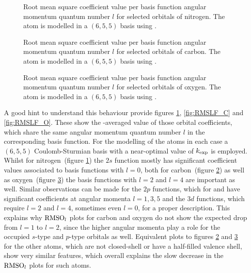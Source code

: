 \begin{figure}
	\centering
	\caption[
		Root mean square coefficient value
		per angular momentum for nitrogen
	]
	{
		Root mean square coefficient value per
		basis function angular momentum quantum number $l$
		for selected orbitals of nitrogen.
		The atom is modelled
		in a $(6,5,5)$ \CS basis using \UHF.
	}
	\label{fig:RMSLF_N}
\end{figure}
\begin{figure}
	\centering
	\caption[
		Root mean square coefficient value
		per angular momentum for carbon
	]
	{
		Root mean square coefficient value per
		basis function angular momentum quantum number $l$
		for selected orbitals of carbon.
		The atom is modelled
		in a $(6,5,5)$ \CS basis using \UHF.
	}
	\label{fig:RMSLF_C}
\end{figure}
\begin{figure}
	\centering
	\caption[
		Root mean square coefficient value
		per angular momentum for oxygen
	]
	{
		Root mean square coefficient value per
		basis function angular momentum quantum number $l$
		for selected orbitals of oxygen.
		The atom is modelled
		in a $(6,5,5)$ \CS basis using \UHF.
	}
	\label{fig:RMSLF_O}
\end{figure}
A good hint to understand this behaviour provide figures
\ref{fig:RMSLF_N}, \vref{fig:RMSLF_C} and \vref{fig:RMSLF_O}.
These show the \RMS-averaged value of those orbital coefficients,
which share the same angular momentum quantum number $l$ in the corresponding
basis function.
For the modelling of the atoms in each case
a $(6,5,5)$ Coulomb-Sturmian basis with a near-optimal value of $k_\text{exp}$ is employed.
Whilst for nitrogen~(figure \ref{fig:RMSLF_N})
the $2s$ function mostly has significant coefficient values
associated to basis functions with $l=0$,
both for carbon~(figure \ref{fig:RMSLF_C}) as well as oxygen~(figure \ref{fig:RMSLF_O})
the basis functions with $l=2$ and $l=4$ are important as well.
Similar observations can be made for the $2p$ functions,
which for  and  have significant coefficients at angular momenta
$l=1,3,5$ and the $3d$ functions, which require $l=2$ and $l=4$,
sometimes even $l=0$, for a proper description.
This explains why $\text{RMSO}_l$ plots for carbon
and oxygen do not show the expected drop from $l=1$ to $l=2$,
since the higher angular momenta play a role
for the occupied $s$-type and $p$-type \SCF orbitals as well.
Equivalent plots to figures \ref{fig:RMSLF_C} and \ref{fig:RMSLF_O}
for the other atoms,
which are not closed-shell
or have a half-filled valence shell,
show very similar features,
which overall explains the slow decrease
in the $\text{RMSO}_l$ plots for such atoms.

